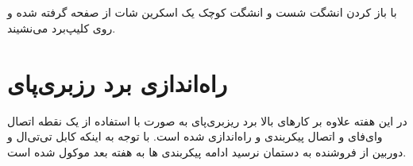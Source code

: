 \documentclass{article}
\begin{document}
\subsection{}
با باز کردن انشگت شست و انشگت کوچک یک اسکرین شات از صفحه گرفته شده و روی کلیپ‌برد می‌نشیند.

\section{راه‌اندازی برد رزبری‌پای}
در این هفته علاوه بر کار‌های بالا برد ریزبری‌پای به صورت  با استفاده از یک نقطه اتصال وای‌فای و اتصال  پیکربندی و راه‌اندازی شده است. با توجه به اینکه کابل تی‌تی‌ال و دوربین از فروشنده به دستمان نرسید ادامه پیکربندی ها به هفته بعد موکول شده است.
\end{document}
